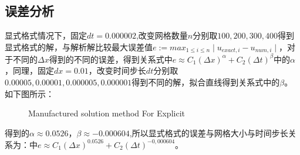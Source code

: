 \documentclass[
	20pt%
]{SUSTechHomework}
\begin{document}
\subsection{误差分析}
\qquad 显式格式情况下，固定$dt=0.000002$,改变网格数量$n$分别取$100, 200, 300, 400$得到显式格式的解，与解析解比较最大误差值$e:=max_{1 \leq i \leq n}\mid u_{exact,i} - u_{num,i}\mid$，对于不同的$\Delta x$得到的不同的误差，得到关系式中$e \approx C_1 (\Delta x)^\alpha + C_2 (\Delta t)^\beta$中的$\alpha$，同理，固定$dx=0.01$，改变时间步长$dt$分别取$0.00005, 0.00001, 0.000005, 0.000001$得到不同的解，拟合直线得到关系式中的$\beta$。如下图所示：
\begin{figure}[h]
    \centering
    \caption{Manufactured solution method For Explicit}
    \label{fig:my_label}
\end{figure}

\qquad 得到的$\alpha \approx 0.0526$，$\beta \approx -0.000604$,所以显式格式的误差与网格大小与时间步长关系为：中$e \approx C_1 (\Delta x)^{0.0526} + C_2 (\Delta t)^{-0,000604}$。
\end{document}
